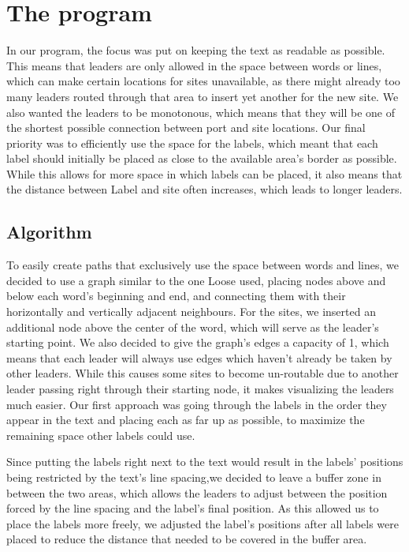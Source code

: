 \documentclass[11pt,a4paper]{article}
\begin{document}
\section{The program}

In our program, the focus was put on keeping the text as readable as possible. This means that leaders are only allowed in the space between words or lines, which can make certain locations for sites unavailable, as there might already too many leaders routed through that area to insert yet another for the new site. 
We also wanted the leaders to be monotonous, which means that they will be one of the shortest possible connection between port and site locations.
Our final priority was to efficiently use the space for the labels, which meant that each label should initially be placed as close to the available area's border as possible.
While this allows for more space in which labels can be placed, it also means that the distance between Label and site often increases, which leads to longer leaders.%

\subsection{Algorithm}%
To easily create paths that exclusively use the space between words and lines, we decided to use a graph similar to the one Loose \cite{Loose2015} used, placing nodes above and below each word's beginning and end, and connecting them with their horizontally and vertically adjacent neighbours.%
For the sites, we inserted an additional node above the center of the word, which will serve as the leader's starting point. We also decided to give the graph's edges a capacity of 1, which means that each leader will always use edges which haven't already be taken by other leaders. While this causes some sites to become un-routable due to another leader passing right through their starting node, it makes visualizing the leaders much easier. Our first approach was going through the labels in the order they appear in the text and placing each as far up as possible, to maximize the remaining space other labels could use.

Since putting the labels right next to the text would result in the labels' positions being restricted by the text's line spacing,we decided to leave a buffer zone in between the two areas, which allows the leaders to adjust between the position forced by the line spacing and the label's final position. As this allowed us to place the labels more freely, we adjusted the label's positions after all labels were placed to reduce the distance that needed to be covered in the buffer area.
\end{document}
